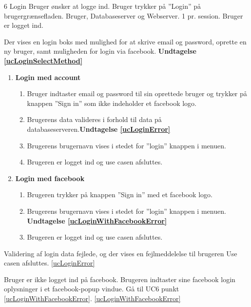 
\uchead
	{6}
	{Login}
	{Bruger ønsker at logge ind.}
	{Bruger trykker på ''Login'' på brugergrænsefladen.}
	{Bruger, Databaseserver og Webserver.}
	{}
	{1 pr. session.}
	{Bruger er logget ind.}	
  
		
\item Der vises en login boks med mulighed for at skrive email og password, oprette en ny bruger, samt muligheden for login via facebook. \textbf{Undtagelse \ref{ucLoginSelectMethod}}

\begin{enumerate}

\item \textbf{Login med account}

	\begin{enumerate}
		\item Bruger indtaster email og password til sin oprettede bruger og trykker på knappen ''Sign in'' som ikke indeholder et facebook logo.
		\item \label{ucLoginError}Brugerens data valideres i forhold til data på databaseserveren.\textbf{Undtagelse \ref{ucLoginError}}
		\item Brugerens brugernavn vises i stedet for ''login'' knappen i menuen.
		\item Brugeren er logget ind og use casen afsluttes.
	\end{enumerate}
	
\item \textbf{Login med facebook}
	
	\begin{enumerate}
		\item Brugeren trykker på knappen ''Sign in'' med et facebook logo.
		\item\label{ucLoginWithFacebookError} Brugerens brugernavn vises i stedet for ''login'' knappen i menuen. \textbf{Undtagelse \ref{ucLoginWithFacebookError}}
		\item Brugeren er logget ind og use casen afsluttes.
				
	\end{enumerate}
\end{enumerate}

\ucdescriptionend %
	\ucextension
	{Validering af login data fejlede, og der vises en fejlmeddelelse til brugeren }
	{Use casen afsluttes.}
	{\ref{ucLoginError}}

\ucextension
	{Bruger er ikke logget ind på facebook. Brugeren indtaster sine facebook login oplysninger i et facebook-popup vindue.}
	{Gå til UC6 punkt \ref{ucLoginWithFacebookError}.}
	{\ref{ucLoginWithFacebookError}}


